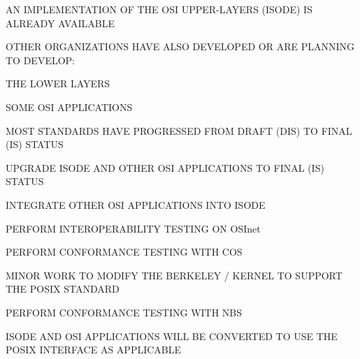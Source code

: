 \begin{bwslide}

\begin{nrtc}
\item	AN IMPLEMENTATION OF THE OSI UPPER-LAYERS (ISODE) IS ALREADY AVAILABLE

\item	OTHER ORGANIZATIONS HAVE ALSO DEVELOPED OR ARE PLANNING TO DEVELOP:
    \begin{nrtc}
    \item	THE LOWER LAYERS

    \item	SOME OSI APPLICATIONS
    \end{nrtc}

\item	MOST STANDARDS HAVE PROGRESSED FROM DRAFT (DIS) TO FINAL (IS) STATUS
\end{nrtc}
\end{bwslide}


\begin{bwslide}
\end{bwslide}


\begin{bwslide}
\end{bwslide}


\begin{bwslide}

\begin{nrtc}
\item	UPGRADE ISODE AND OTHER OSI APPLICATIONS TO FINAL (IS) STATUS

\item	INTEGRATE OTHER OSI APPLICATIONS INTO ISODE

\item	PERFORM INTEROPERABILITY TESTING ON OSInet

\item	PERFORM CONFORMANCE TESTING WITH COS
\end{nrtc}
\end{bwslide}


\begin{bwslide}

\begin{nrtc}
\item	MINOR WORK TO MODIFY THE BERKELEY \unix/ KERNEL TO SUPPORT THE POSIX
	STANDARD

\item	PERFORM CONFORMANCE TESTING WITH NBS

\item	ISODE AND OSI APPLICATIONS WILL BE CONVERTED TO USE THE POSIX
	INTERFACE AS APPLICABLE
\end{nrtc}
\end{bwslide}


